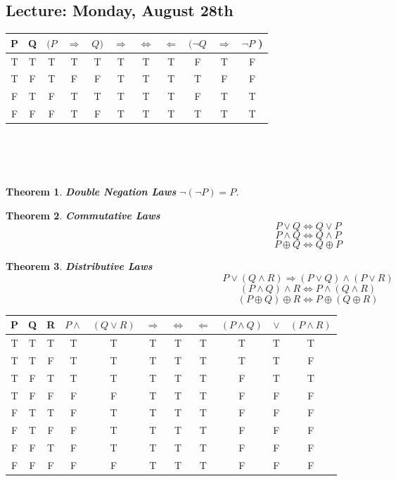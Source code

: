 \documentclass[10pt]{article}
\theoremstyle{plain}
\newtheorem{Thm}{Theorem}
\theoremstyle{definition}
\begin{document}
\subsection*{Lecture: Monday, August 28th}

\begin{tabular}{cc|ccc|ccc|ccc}
P & Q & $(P$ & $\Rightarrow$ & $Q)$ & $\Rightarrow$ & $\Leftrightarrow$ & $\Leftarrow$ & $( \neg Q$ & $\Rightarrow$ & $\neg P$ ) \\
\hline
T & T & T & T & T & T & T & T & F & T & F\\
T & F & T & F & F & T & T & T & T & F & F\\
F & T & F & T & T & T & T & T & F & T & T\\
F & F & F & T & F & T & T & T & T & T & T\\
\end{tabular}\\\\\\

\begin{Thm}
\textbf{Double Negation Laws} $\neg(\neg P) = P$. 
\end{Thm}

\begin{Thm}
\textbf{Commutative Laws} 
\[P \vee Q \Leftrightarrow Q \vee P\]
\[P \wedge Q \Leftrightarrow Q \wedge P\]
\[P \oplus Q \Leftrightarrow Q \oplus P\]
\end{Thm}

\begin{Thm}
\textbf{Distributive Laws} 
\[P \vee ( Q \wedge R) \Rightarrow (P \vee Q) \wedge (P \vee R)\]
\[(P \wedge Q) \wedge R \Leftrightarrow P \wedge (Q \wedge R)\]
\[(P \oplus Q) \oplus R \Leftrightarrow P \oplus(Q \oplus R)\]
\end{Thm}

\begin{tabular}{ccc|cc|ccc|ccc}
P & Q & R & $P \wedge $ & $(Q \vee R)$ & $\Rightarrow$ & $\Leftrightarrow$ & $\Leftarrow$ & $ (P \wedge Q) $ & $\vee$ & $(P \wedge R)$ \\
\hline
T & T & T & T & T & T & T & T & T & T & T\\
T & T & F & T & T & T & T & T & T & T & F\\
T & F & T & T & T & T & T & T & F & T & T\\
T & F & F & F & F & T & T & T & F & F & F\\

F & T & T & F & T & T & T & T & F & F & F\\
F & T & F & F & T & T & T & T & F & F & F\\
F & F & T & F & T & T & T & T & F & F & F\\
F & F & F & F & F & T & T & T & F & F & F\\
\end{tabular}\\\\\
\end{document}
